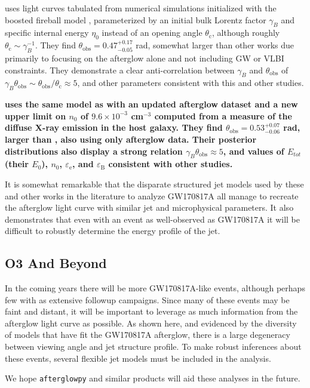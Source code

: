 \documentclass[twocolumn]{aastex62}
\newcommand{\gwbns}{GW170817A}
\newcommand{\afterglowpy}{{\tt afterglowpy}}
\newcommand{\thobs}{\ensuremath{\theta_{\mathrm{obs}}}}
\newcommand{\thC}{\ensuremath{\theta_{\mathrm{c}}}}
\newcommand{\epse}{\ensuremath{\varepsilon_{\mathrm{e}}}}
\newcommand{\epsB}{\ensuremath{\varepsilon_{\mathrm{B}}}}
\begin{document}
\citet{Wu:2018aa} uses light curves tabulated from numerical simulations initialized with the boosted fireball model \citep{Duffell:2013aa}, parameterized by an initial bulk Lorentz factor $\gamma_B$ and specific internal energy $\eta_0$ instead of an opening angle $\thC$, although roughly $\thC \sim \gamma_B^{-1}$.  They find $\thobs = 0.47^{+0.17}_{-0.05}$ rad, somewhat larger than other works due primarily to focusing on the afterglow alone and not including GW or VLBI constraints.  They demonstrate a clear anti-correlation between $\gamma_B$ and $\thobs$ of $\gamma_B \thobs  \sim \thobs/\thC \approx 5$, and other parameters consistent with this and other studies.

{\bf \citet{Hajela:2019aa} uses the same model as \citet{Wu:2018aa} with an updated afterglow dataset and a new upper limit on $n_0$ of $9.6\times 10^{-3}$ cm$^{-3}$ computed from a measure of the diffuse X-ray emission in the host galaxy.  They find $\thobs = 0.53^{+0.07}_{-0.06}$ rad, larger than \citet{Wu:2018aa}, also using only afterglow data.  Their posterior distributions also display a strong relation $\gamma_B \thobs \approx 5$,  and values of $E_{tot}$ (their $E_0$), $n_0$, $\epse$, and $\epsB$ consistent with other studies. }

It is somewhat remarkable that the disparate structured jet models used by these and other works in the literature to analyze \gwbns{} all manage to recreate the afterglow light curve with similar jet and microphysical parameters.  It also demonstrates that even with an event as well-observed as \gwbns{} it will be difficult to robustly determine the energy profile of the jet.  

\subsection{O3 And Beyond}

In the coming years there will be more \gwbns{}-like events, although perhaps few with as extensive followup campaigns.  Since many of these events may be faint and distant, it will be important to leverage as much information from the afterglow light curve as possible.  As shown here, and evidenced by the diversity of models that have fit the \gwbns{} afterglow, there is a large degeneracy between viewing angle and jet structure profile.  To make robust inferences about these events, several flexible jet models must be included in the analysis.  

We hope \afterglowpy{} and similar products will aid these analyses in the future.  
\end{document}
